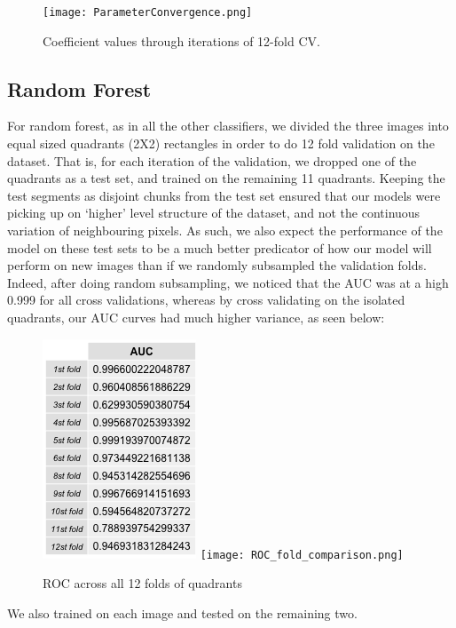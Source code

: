 \documentclass{article}\usepackage[]{graphicx}\usepackage[]{color}
\begin{document}
\begin{figure}[H]
\begin{center}
\texttt{[image: ParameterConvergence.png]}
\caption{Coefficient values through iterations of 12-fold CV.}
\end{center}
\end{figure}

\subsection{Random Forest}

For random forest, as in all the other classifiers, we divided the three images into equal sized quadrants (2X2) rectangles in order to do 12 fold validation on the dataset.  That is, for each iteration of the validation, we dropped one of the quadrants as a test set, and trained on the remaining 11 quadrants.  Keeping the test segments as disjoint chunks from the test set ensured that our models were picking up on `higher' level structure of the dataset, and not the continuous variation of neighbouring pixels.  As such, we also expect the performance of the model on these test sets to be a much better predicator of how our model will perform on new images than if we randomly subsampled the validation folds.  Indeed, after doing random subsampling, we noticed that the AUC was at a high 0.999 for all cross validations, whereas by cross validating on the isolated quadrants, our AUC curves had much higher variance, as seen below: \\

\begin{figure}[H]
  \includegraphics[width=\linewidth, height = 150pts]{AUC_12_folds.png}
\endminipage\hfill
{}%
  \texttt{[image: ROC\_fold\_comparison.png]}
\endminipage
  \caption{ROC across all 12 folds of quadrants}\label{}
\end{figure}

We also trained on each image and tested on the remaining two. \\
\end{document}
